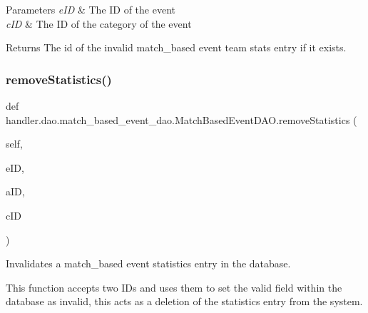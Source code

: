 \begin{DoxyParams}{Parameters}
{\em e\+ID} & The ID of the event \\
\hline
{\em c\+ID} & The ID of the category of the event\\
\hline
\end{DoxyParams}
\begin{DoxyReturn}{Returns}
The id of the invalid match\+\_\+based event team stats entry if it exists. 
\end{DoxyReturn}
\mbox{\label{classhandler_1_1dao_1_1match__based__event__dao_1_1_match_based_event_d_a_o_a8234a607c25d64360e8de596ff9146fe}} 
\subsubsection{\texorpdfstring{remove\+Statistics()}{removeStatistics()}}
{\footnotesize\ttfamily def handler.\+dao.\+match\+\_\+based\+\_\+event\+\_\+dao.\+Match\+Based\+Event\+D\+A\+O.\+remove\+Statistics (\begin{DoxyParamCaption}\item[{}]{self,  }\item[{}]{e\+ID,  }\item[{}]{a\+ID,  }\item[{}]{c\+ID }\end{DoxyParamCaption})}



Invalidates a match\+\_\+based event statistics entry in the database. 

This function accepts two I\+Ds and uses them to set the valid field within the database as invalid, this acts as a deletion of the statistics entry from the system.


